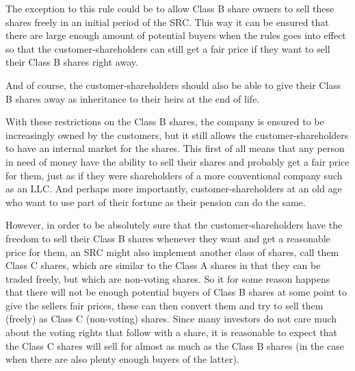 \documentclass{article}
\begin{document}
The exception to this rule could be to allow Class B share owners to sell these shares freely in an initial period of the SRC. This way it can be ensured that there are large enough amount of potential buyers when the rules goes into effect so that the customer-shareholders can still get a fair price if they want to sell their Class B shares right away.

And of course, the customer-shareholders should also be able to give their Class B shares away as inheritance to their heirs at the end of life. 

With these restrictions on the Class B shares, the company is ensured to be increasingly owned by the customers, but it still allows the customer-shareholders to have an internal market for the shares. This first of all means that any person in need of money have the ability to sell their shares and probably get a fair price for them, just as if they were shareholders of a more conventional company such as an LLC. And perhaps more importantly, customer-shareholders at an old age who want to use part of their fortune as their pension can do the same. 

However, in order to be absolutely sure that the customer-shareholders have the freedom to sell their Class B shares whenever they want and get a reasonable price for them, an SRC might also implement another class of shares, call them Class C shares, which are similar to the Class A shares in that they can be traded freely, but which are non-voting shares. So it for some reason happens that there will not be enough potential buyers of Class B shares at some point to give the sellers fair prices, these can then convert them and try to sell them (freely) as Class C (non-voting) shares. Since many investors do not care much about the voting rights that follow with a share, it is reasonable to expect that the Class C shares will sell for almost as much as the Class B shares (in the case when there are also plenty enough buyers of the latter). 




\end{document}
